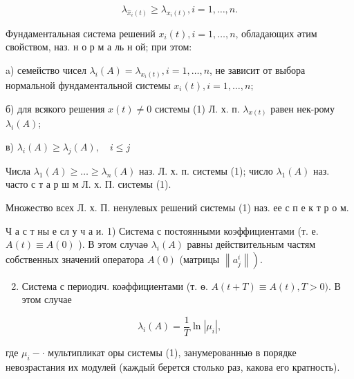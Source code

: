 \documentclass[10pt]{article}
\begin{document}
\[

\lambda_{\hat{x}_{i}(t)} \geqslant \lambda_{x_{i}(t)}, i=1, \ldots, n .

\]



Фундаментальная система решений $x_{i}(t), i=1, \ldots, n$, обладающих әтим свойством, наз. н о р м а ль н ой; при этом:



a) семейство чисел $\lambda_{i}(A)=\lambda_{x_{i}(t)}, i=1, \ldots, n$, не зависит от выбора нормальной фундаментальной системы $x_{i}(t), i=1, \ldots, n$;



б) для всякого решения $x(t) \neq 0$ системы (1) Л. х. п. $\lambda_{x(t)}$ равен нек-рому $\lambda_{i}(A)$;



в) $\lambda_{i}(A) \geqslant \lambda_{j}(A), \quad i \leqslant j$



Числа $\lambda_{1}(A) \geqslant \ldots \geqslant \lambda_{n}(A)$ наз. Л. х. п. системы (1); число $\lambda_{1}(A)$ наз. часто с т а р ш м Л. х. П. системы (1).



Множество всех Л. х. П. ненулевых решений системы (1) наз. ее с п е к т р о м.



Ч а с т ны е сл у ч а и. 1) Система с постоянными коэффициентами (т. е. $A(t) \equiv A(0)$ ). В этом случаө $\lambda_{i}(A)$ равны действительным частям собственных значений оператора $A(0)$ (матрицы $\left.\left\|a_{j}^{i}\right\|\right)$.



\begin{enumerate}

  \setcounter{enumi}{1}

  \item Система с периодич. коәффициентами (т. ө. $A(t+T) \equiv A(t), T>0)$. В этом случае

\end{enumerate}



\[

\lambda_{i}(A)=\frac{1}{T} \ln \left|\mu_{i}\right|,

\]



где $\mu_{i}-\cdot$ мультипликат оры системы (1), занумерованныө в порядке невозрастания их модулей (каждый берется столько раз, какова его кратность).
\end{document}
